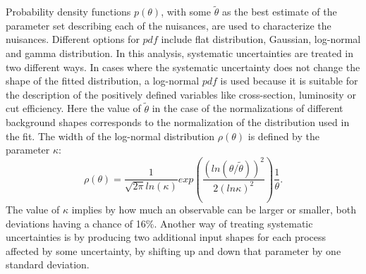Probability density functions $p(\theta)$, with some $\widetilde{\theta}$ as the best estimate of the parameter set describing each of the nuisances, are used to characterize the nuisances. Different options for $pdf$ include flat distribution, Gaussian, log-normal and gamma distribution. In this analysis, systematic uncertainties are treated in two different ways. In cases where the systematic uncertainty does not change the shape of the fitted distribution, a log-normal $pdf$ is used because it is suitable for the description of the positively defined variables like cross-section, luminosity or cut efficiency. Here the value of $\widetilde{\theta}$ in the case of the normalizations of different background shapes corresponds to the normalization of the distribution used in the fit. The width of the log-normal distribution $\rho(\theta)$ is defined by the parameter $\kappa$:
\begin{equation}
\rho(\theta) = \frac{1}{\sqrt{2\pi}ln(\kappa)}exp\left(\frac{(ln(\theta/\widetilde{\theta}))^2}{2(ln \kappa)^2}\right)\frac{1}{\theta}.
\end{equation}
The value of $\kappa$ implies by how much an observable can be larger or smaller, both deviations having a chance of 16$\%$. Another way of treating systematic uncertainties is by producing two additional input shapes for each process affected by some uncertainty, by shifting up and down that parameter by one standard deviation. 
